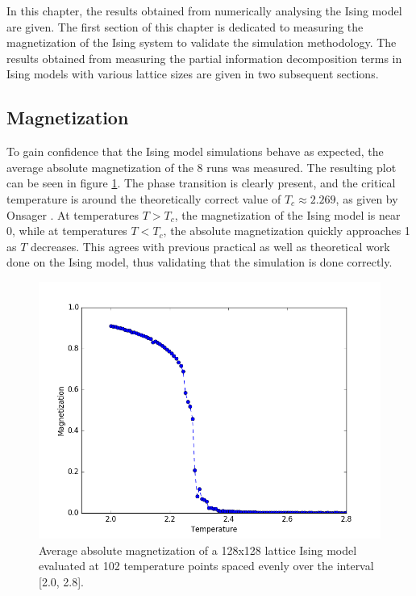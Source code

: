 \documentclass[12pt]{article}
\begin{document}
In this chapter, the results obtained from numerically analysing the Ising model are given. The first section of this chapter  is dedicated to measuring the magnetization of the Ising system to validate the simulation methodology. The results obtained from measuring the partial information decomposition terms in Ising models with various lattice sizes are given in two subsequent sections.

\subsection{Magnetization} 

To gain confidence that the Ising model simulations behave as expected, the average absolute magnetization of the 8 runs was measured. The resulting plot can be seen in figure \ref{fig:ising-128-mags}. The phase transition is clearly present, and the critical temperature is around the theoretically correct value of $T_c \approx 2.269$, as given by Onsager \cite{lars-onsanger}. At temperatures $T > T_c$, the magnetization of the Ising model is near 0, while at temperatures $T < T_c$, the absolute magnetization quickly approaches 1 as $T$ decreases. This agrees with previous practical as well as theoretical work done on the Ising model, thus validating that the simulation is done correctly.

\begin{figure} [h!]
\begin{center}
\includegraphics[width=\textwidth]{ising-128-mags}
\caption{Average absolute magnetization of a 128x128 lattice Ising model evaluated at 102 temperature points spaced evenly over the interval [2.0, 2.8].}
\label{fig:ising-128-mags}
\end{center}
\end{figure}
\end{document}
